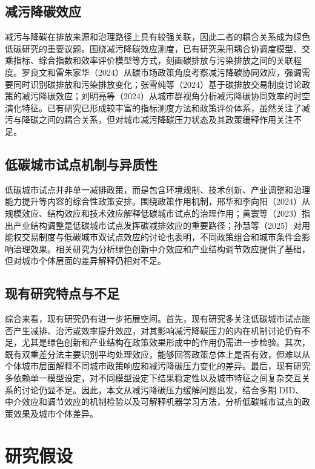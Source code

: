 \documentclass[12pt,a4paper]{ctexart}
\begin{document}
\subsection{减污降碳效应}

减污与降碳在排放来源和治理路径上具有较强关联，因此二者的耦合关系成为绿色低碳研究的重要议题。围绕减污降碳效应测度，已有研究采用耦合协调度模型、交乘指标、综合指数和效率评价模型等方式，刻画碳排放与污染排放之间的关联程度。罗良文和雷朱家华（2024）从碳市场政策角度考察减污降碳协同效应，强调需要同时识别碳排放和污染排放变化；张雪纯等（2024）基于碳排放交易制度讨论政策的减污降碳效应；刘明亮等（2024）从城市群视角分析减污降碳协同效率的时空演化特征。已有研究已形成较丰富的指标测度方法和政策评价体系，虽然关注了减污与降碳之间的耦合关系，但对城市减污降碳压力状态及其政策缓释作用关注不足。

\subsection{低碳城市试点机制与异质性}

低碳城市试点并非单一减排政策，而是包含环境规制、技术创新、产业调整和治理能力提升等内容的综合性政策安排。围绕政策作用机制，邢华和李向阳（2024）从规模效应、结构效应和技术效应解释低碳城市试点的治理作用；黄寰等（2023）指出产业结构调整是低碳城市试点发挥碳减排效应的重要路径；孙慧等（2025）对用能权交易制度与低碳城市双试点效应的讨论也表明，不同政策组合和城市条件会影响治理效果。相关研究为分析绿色创新中介效应和产业结构调节效应提供了基础，但对城市个体层面的差异解释仍相对不足。

\subsection{现有研究特点与不足}

综合来看，现有研究仍有进一步拓展空间。首先，现有研究多关注低碳城市试点能否产生减排、治污或效率提升效应，对其影响减污降碳压力的内在机制讨论仍有不足，尤其是绿色创新和产业结构在政策效果形成中的作用仍需进一步检验。其次，既有双重差分法主要识别平均处理效应，能够回答政策总体上是否有效，但难以从个体城市层面解释不同城市政策响应和减污降碳压力变化的差异。最后，现有研究多依赖单一模型设定，对不同模型设定下结果稳定性以及城市特征之间复杂交互关系的讨论仍显不足。因此，本文从减污降碳压力缓解问题出发，结合多期 DID、中介效应和调节效应的机制检验以及可解释机器学习方法，分析低碳城市试点的政策效果及城市个体差异。


\section{研究假设}
\end{document}
